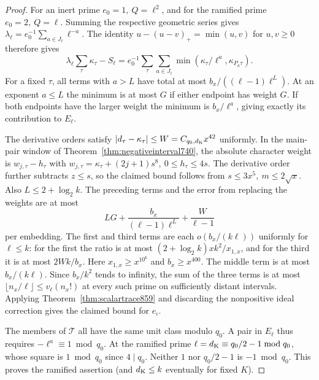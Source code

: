 \documentclass[a4paper,11pt]{article}
\theoremstyle{definition}
\theoremstyle{remark}
\numberwithin{equation}{section}
\begin{document}
\begin{proof}
For an inert prime \(e_0=1,\ Q=\ell^2\), and for the ramified
prime \(e_0=2,\ Q=\ell\). Summing the respective geometric
series gives \(\lambda_\ell=e_0^{-1}\sum_{a\in J_\ell}\ell^{-a}\).
The identity \(u-(u-v)_+=\min(u,v)\) for \(u,v\ge0\) therefore
gives
\[
  \lambda_\ell\sum_\tau\kappa_\tau-S_\ell
   =e_0^{-1}\sum_\tau\sum_{a\in J_\ell}
                    \min(\kappa_\tau/\ell^a,\kappa_{P_a\tau}).
\]
For a fixed \(\tau\), all terms with \(a>L\) have total at
most \(b_x/((\ell-1)\ell^L)\). At an exponent \(a\le L\)
the minimum is at most \(G\) if either endpoint has weight
\(G\). If both endpoints have the larger weight the minimum
is \(b_x/\ell^a\), giving exactly its contribution to
\(E_\ell\).

The derivative orders satisfy \(|d_\tau-\kappa_\tau|
\le W=C_{q_0,d_{\rm K}}x^{42}\) uniformly. In the main-pair
window of Theorem~\ref{thm:negativeinterval740}, the absolute
character weight is \(w_{j,\tau}-h_\tau\) with
\(w_{j,\tau}=\kappa_\tau+(2j+1)s^8,\ 0\le h_\tau\le4s\).
The derivative order further subtracts \(z\le s\), so the
claimed bound follows from \(s\le3x^5,\ m\le2\sqrt x\).
Also \(L\le2+\log_2 k\). The preceding terms and the error
from replacing the weights are at most
\[
             LG+\frac{b_x}{(\ell-1)\ell^L}
                         +\frac{W}{\ell-1}
\]
per embedding. The first and third terms are each
\(o(b_x/(k\ell))\) uniformly for \(\ell\le k\): for the first
the ratio is at most \((2+\log_2 k)xk^2/x_{1,x}\), and for
the third it is at most \(2Wk/b_x\). Here \(x_{1,x}\ge x^{10^6}\)
and \(b_x\ge x^{400}\). The middle term is at most
\(b_x/(k\ell)\). Since \(b_x/k^2\) tends to infinity, the
sum of the three terms is at most
\(\lfloor n_x/\ell\rfloor\le v_\ell(n_x!)\) at every such prime
on sufficiently distant intervals. Applying
Theorem~\ref{thm:scalartrace859} and discarding the
nonpositive ideal correction gives the claimed bound for
\(e_\iota\).

The members of \(\mathcal T\) all have the same unit class
modulo \(q_0\). A pair in \(E_\ell\) thus requires
\(-\ell^a\equiv1\bmod q_0\). At the ramified prime
\(\ell=d_{\rm K}\equiv q_0/2-1\bmod q_0\), whose square is
\(1\bmod q_0\) since \(4\mid q_0\). Neither \(1\) nor
\(q_0/2-1\) is \(-1\bmod q_0\). This proves the ramified
assertion (and \(d_{\rm K}\le k\) eventually for fixed \(K\)).


\end{proof}
\end{document}
